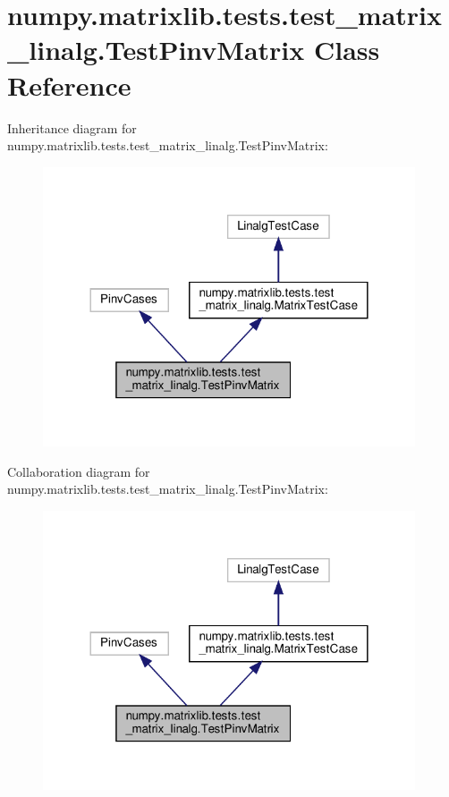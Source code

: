 \hypertarget{classnumpy_1_1matrixlib_1_1tests_1_1test__matrix__linalg_1_1TestPinvMatrix}{}\section{numpy.\+matrixlib.\+tests.\+test\+\_\+matrix\+\_\+linalg.\+Test\+Pinv\+Matrix Class Reference}
\label{classnumpy_1_1matrixlib_1_1tests_1_1test__matrix__linalg_1_1TestPinvMatrix}


Inheritance diagram for numpy.\+matrixlib.\+tests.\+test\+\_\+matrix\+\_\+linalg.\+Test\+Pinv\+Matrix\+:
\nopagebreak
\begin{figure}[H]
\begin{center}
\leavevmode
\includegraphics[width=312pt]{classnumpy_1_1matrixlib_1_1tests_1_1test__matrix__linalg_1_1TestPinvMatrix__inherit__graph}
\end{center}
\end{figure}


Collaboration diagram for numpy.\+matrixlib.\+tests.\+test\+\_\+matrix\+\_\+linalg.\+Test\+Pinv\+Matrix\+:
\nopagebreak
\begin{figure}[H]
\begin{center}
\leavevmode
\includegraphics[width=312pt]{classnumpy_1_1matrixlib_1_1tests_1_1test__matrix__linalg_1_1TestPinvMatrix__coll__graph}
\end{center}
\end{figure}

